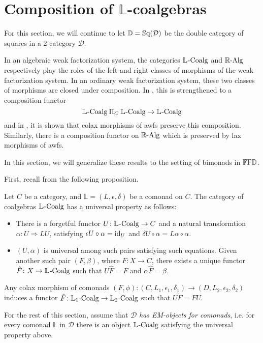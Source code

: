 
\chapter{Composition of $\mathbb{L}$-coalgebras}

For this section, we will continue to let $\mathbb{D}=\Sq(\mathcal{D})$ be the double category of squares in a 2-category $\mathcal{D}$.

In an algebraic weak factorization system, the categories $\LCoalg$ and $\RAlg$ respectively play the roles of the left and right classes of morphisms of the weak factorization system. In an ordinary weak factorization system, these two classes of morphisms are closed under composition. In \cite{garner:soa}, this is strengthened to a composition functor
\[
	\LCoalg \prodb_C \LCoalg \to \LCoalg
\]
and in \cite{riehl:nwfs-model}, it is shown that colax morphisms of awfs preserve this composition. Similarly, there is a composition functor on $\RAlg$ which is preserved by lax morphisms of awfs.

In this section, we will generalize these results to the setting of bimonads in $\FF{\mathbb{D}}$.

First, recall from \cite{street:ftm} the following proposition.

\begin{proposition}\label{Prop:EMObject}
	Let $C$ be a category, and $\mathbb{L}=(L,\epsilon,\delta)$ be a comonad on $C$. The category of coalgebras $\LCoalg$ has a universal property as follows:
	\begin{itemize}
	 	\item There is a forgetful functor $U\colon \LCoalg \to C$ and a natural transformtion $\alpha\colon U \Rightarrow LU$, satisfying $\epsilon U\circ\alpha = \id_U$ and $\delta U \circ \alpha = L\alpha\circ\alpha$.
	 	\item $(U,\alpha)$ is universal among such pairs satisfying such equations. Given another such pair $(F,\beta)$, where $F\colon X\to C$, there exists a unique functor $\hat{F}\colon X\to \LCoalg$ such that $U\hat{F}=F$ and $\alpha\hat{F}=\beta$.
	 \end{itemize}
	 Any colax morphism of comonads $(F,\phi)\colon(C,L_1,\epsilon_1,\delta_1)\to(D,L_2,\epsilon_2,\delta_2)$ induces a functor $\tilde{F}\colon\LCoalg[1]\to\LCoalg[2]$ such that $U\tilde{F}=FU$.
\end{proposition}

For the rest of this section, assume that $\mathcal{D}$ \emph{has EM-objects for comonads}, i.e. for every comonad $\mathbb{L}$ in $\mathcal{D}$ there is an object $\LCoalg$ satisfying the universal property above.

